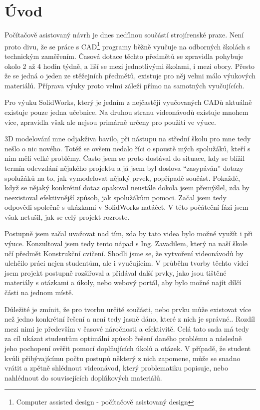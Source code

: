 \chapter*{Úvod}
Počítačově asistovaný návrh je dnes nedílnou součástí strojírenské praxe.
Není proto divu, že se práce s CAD\footnote{Computer assisted design - počítačově asistovaný design} programy běžně vyučuje na odborných školách s technickým zaměřením.
Časová dotace těchto předmětů se zpravidla pohybuje okolo 2 až 4 hodin týdně, a liší se mezi jednotlivými školami, i mezi obory.
Přesto že se jedná o jeden ze stěžejních předmětů, existuje pro něj velmi málo výukových materiálů.
Příprava výuky proto velmi záleží přímo na samotných vyučujících.

Pro výuku SolidWorks, který je jedním z nejčastěji vyučovaných CADů aktuálně existuje pouze jedna učebnice.
Na druhou stranu videonávodů existuje mnohem více, zpravidla však ale nejsou primárně určeny pro použití ve výuce.

3D modelování mne odjakživa bavilo, při nástupu na střední školu pro mne tedy nešlo o nic nového.
Totéž se ovšem nedalo říci o spoustě mých spolužáků, kteří s ním měli velké problémy.
Často jsem se proto dostával do situace, kdy se blížil termín odevzdání nějakého projektu a já jsem byl doslova \enquote{zasypáván} dotazy spolužáků na to, jak vymodelovat nějaký prvek, popřípadě součást.
Pokaždé, když se nějaký konkrétní dotaz opakoval neustále dokola jsem přemýšlel, zda by neexistoval efektivnější způsob, jak spolužákům pomoci.
Začal jsem tedy odpovědi společně s ukázkami v SolidWorks natáčet.
V této počáteční fázi jsem však netušil, jak se celý projekt rozroste.

Postupně jsem začal uvažovat nad tím, zda by tato videa bylo možné využít i při výuce.
Konzultoval jsem tedy tento nápad s Ing. Zavadilem, který na naší škole učí předmět Konstrukční cvičení.
Shodli jsme se, že vytvoření videonávodů by ulehčilo práci nejen studentům, ale i vyučujícím.
V průběhu tvorby těchto videí jsem projekt postupně rozšiřoval a přidával další prvky, jako jsou tištěné materiály s otázkami a úkoly, nebo webový portál, aby bylo možné najít dílčí části na jednom místě.

Důležité je zmínit, že pro tvorbu určité součásti, nebo prvku může existovat více než jedno konkrétní řešení a není tedy jasně dáno, které z nich je správné..
Rozdíl mezi nimi je především v časové náročnosti a efektivitě.
Celá tato sada má tedy za cíl ukázat studentům optimální způsob řešení daného problému a následně jeho pochopení ověřit pomocí doplňujících úkolů a otázek.
V případě, že student kvůli přibývajícímu počtu postupů některý z nich zapomene, může se snadno vrátit a zpětně shlédnout videonávod, který problematiku popisuje, nebo nahlédnout do souvisejících doplňkových materiálů.

\newpage
